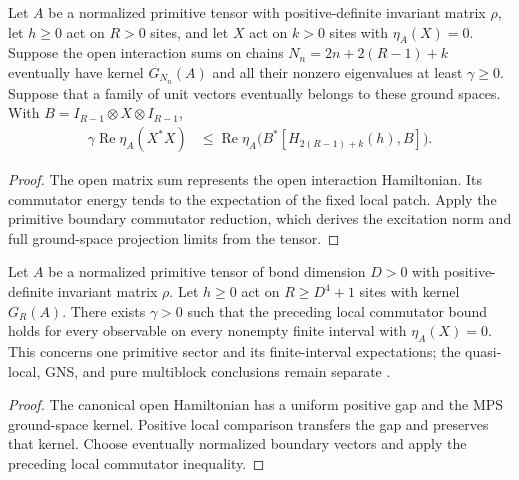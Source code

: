 \begin{lemma}
    \label{thm:primitive_local_open_interaction_commutator_gap}
    \leanok
    Let $A$ be a normalized primitive tensor with positive-definite invariant
    matrix $\rho$, let $h\geq0$ act on $R>0$ sites, and let $X$ act on
    $k>0$ sites with $\eta_A(X)=0$. Suppose the open interaction sums
    on chains $N_n=2n+2(R-1)+k$ eventually have kernel $G_{N_n}(A)$
    and all their nonzero eigenvalues at least $\gamma\geq0$. Suppose that
    a family of unit
    vectors eventually belongs to these ground spaces.
    With $B=I_{R-1}\otimes X\otimes I_{R-1}$,
    \begin{align}
        \gamma\operatorname{Re}\eta_A(X^*X)
         & \leq\operatorname{Re}\eta_A\bigl(B^*[H_{2(R-1)+k}(h),B]\bigr).
    \end{align}
\end{lemma}
\begin{proof}\leanok
    The open matrix sum represents the open interaction Hamiltonian.
    Its commutator energy tends to the expectation of the fixed local patch.
    Apply the primitive boundary commutator reduction, which derives the
    excitation norm and full ground-space projection limits from the tensor.
\end{proof}

\begin{lemma}
    \label{thm:primitive_local_positive_parent_commutator_gap}
    \leanok
    Let $A$ be a normalized primitive tensor of bond dimension $D>0$ with
    positive-definite invariant matrix $\rho$. Let $h\geq0$ act on
    $R\geq D^4+1$ sites with kernel $G_R(A)$. There exists $\gamma>0$
    such that the preceding local commutator bound holds for every
    observable on every nonempty finite interval with $\eta_A(X)=0$.
    This concerns one primitive sector and its finite-interval expectations;
    the quasi-local, GNS, and pure multiblock conclusions remain separate
    \cite{gap:nachtergaele96_infinite_volume_ground_projection}.
\end{lemma}
\begin{proof}\leanok
    The canonical open Hamiltonian has a uniform positive gap and the MPS
    ground-space kernel. Positive local comparison transfers the gap and
    preserves that kernel. Choose eventually normalized boundary vectors
    and apply the preceding local commutator inequality.
\end{proof}

